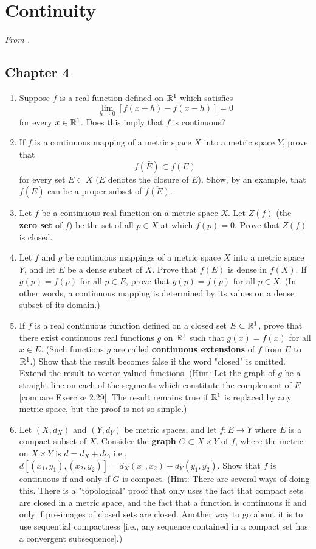 \documentclass[../psets.tex]{subfiles}
\begin{document}
\section{Continuity}
\emph{From \textcite{bib:Rudin}.}
\subsection*{Chapter 4}
\begin{enumerate}[label={\textbf{\arabic*.}}]
    \item {}Suppose $f$ is a real function defined on $\mathbb{R}^1$ which satisfies
    \begin{equation*}
        \lim_{h\to 0}[f(x+h)-f(x-h)] = 0
    \end{equation*}
    for every $x\in\mathbb{R}^1$. Does this imply that $f$ is continuous?
    \item If $f$ is a continuous mapping of a metric space $X$ into a metric space $Y$, prove that
    \begin{equation*}
        f(\bar{E}) \subset \overline{f(E)}
    \end{equation*}
    for every set $E\subset X$ ($\bar{E}$ denotes the closure of $E$). Show, by an example, that $f(\bar{E})$ can be a proper subset of $\overline{f(E)}$.
    \item Let $f$ be a continuous real function on a metric space $X$. Let $Z(f)$ (the \textbf{zero set} of $f$) be the set of all $p\in X$ at which $f(p)=0$. Prove that $Z(f)$ is closed.
    \item Let $f$ and $g$ be continuous mappings of a metric space $X$ into a metric space $Y$, and let $E$ be a dense subset of $X$. Prove that $f(E)$ is dense in $f(X)$. If $g(p)=f(p)$ for all $p\in E$, prove that $g(p)=f(p)$ for all $p\in X$. (In other words, a continuous mapping is determined by its values on a dense subset of its domain.)
    \item If $f$ is a real continuous function defined on a closed set $E\subset\mathbb{R}^1$, prove that there exist continuous real functions $g$ on $\mathbb{R}^1$ such that $g(x)=f(x)$ for all $x\in E$. (Such functions $g$ are called \textbf{continuous extensions} of $f$ from $E$ to $\mathbb{R}^1$.) Show that the result becomes false if the word "closed" is omitted. Extend the result to vector-valued functions. (Hint: Let the graph of $g$ be a straight line on each of the segments which constitute the complement of $E$ [compare Exercise 2.29]. The result remains true if $\mathbb{R}^1$ is replaced by any metric space, but the proof is not so simple.)
    \item Let $(X,d_X)$ and $(Y,d_Y)$ be metric spaces, and let $f:E\to Y$ where $E$ is a compact subset of $X$. Consider the \textbf{graph} $G\subset X\times Y$ of $f$, where the metric on $X\times Y$ is $d=d_X+d_Y$, i.e., $d[(x_1,y_1),(x_2,y_2)]=d_X(x_1,x_2)+d_Y(y_1,y_2)$. Show that $f$ is continuous if and only if $G$ is compact. (Hint: There are several ways of doing this. There is a "topological" proof that only uses the fact that compact sets are closed in a metric space, and the fact that a function is continuous if and only if pre-images of closed sets are closed. Another way to go about it is to use sequential compactness [i.e., any sequence contained in a compact set has a convergent subsequence].)

\end{enumerate}
\end{document}
